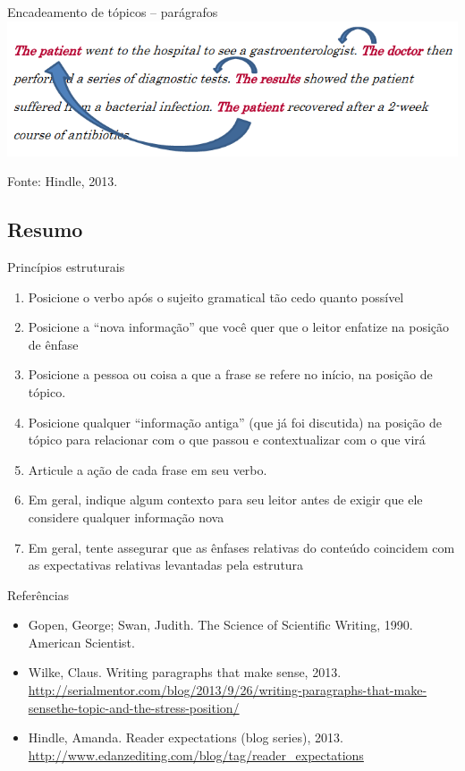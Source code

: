 \documentclass{beamer}
\begin{document}
\begin{frame}{Encadeamento de tópicos -- parágrafos}
    \includegraphics[width=\textwidth]{Escrita/encadeamento2}

  \vfill
  Fonte: Hindle, 2013.
\end{frame}

\subsection{Resumo}

\begin{frame}{Princípios estruturais}

  \begin{enumerate}
  \item Posicione o verbo após o sujeito gramatical tão cedo quanto
    possível
  \item Posicione a ``nova informação'' que você quer que o leitor
    enfatize na posição de ênfase
  \item Posicione a pessoa ou coisa a que a frase se refere no início,
    na posição de tópico.
  \item Posicione qualquer ``informação antiga'' (que já foi
    discutida) na posição de tópico para relacionar com o que passou e
    contextualizar com o que virá
  \item Articule a ação de cada frase em seu verbo.
  \item Em geral, indique algum contexto para seu leitor antes de
    exigir que ele considere qualquer informação nova
  \item Em geral, tente assegurar que as ênfases relativas do conteúdo
    coincidem com as expectativas relativas levantadas pela estrutura
  \end{enumerate}
\end{frame}

\begin{frame}{Referências}
  \begin{itemize}
  \item<1-> Gopen, George; Swan, Judith. The Science of Scientific
    Writing, 1990. American Scientist.
  \item<1-> Wilke, Claus. Writing paragraphs that make sense,
    2013. \url{http://serialmentor.com/blog/2013/9/26/writing-paragraphs-that-make-sensethe-topic-and-the-stress-position/}
  \item<1-> Hindle, Amanda. Reader expectations (blog series),
    2013. \url{http://www.edanzediting.com/blog/tag/reader_expectations}
  \end{itemize}
\end{frame}
\end{document}

